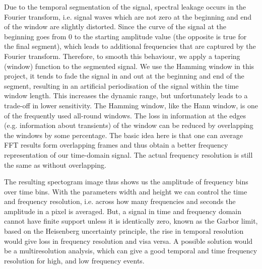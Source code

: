 
Due to the temporal segmentation of the signal, spectral leakage occurs in the Fourier transform, i.e. signal waves which are not zero at the beginning and end of the window are slightly distorted.
Since the curve of the signal at the beginning goes from 0 to the starting amplitude value (the opposite is true for the final segment), which leads to additional frequencies that are captured by the Fourier transform.
Therefore, to smooth this behaviour, we apply a tapering (window) function to the segmented signal. We use the Hamming window in this project, it tends to fade the signal in and out at the beginning and end of the segment, resulting in an artificial periodisation of the signal within the time window length. This increases the dynamic range, but unfortunately leads to a trade-off in lower sensitivity. The Hamming window, like the Hann window, is one of the frequently used all-round windows.
The loss in information at the edges (e.g. information about transients) of the window can be reduced by overlapping the windows by some percentage. The basic idea here is that one can average FFT results form overlapping frames and thus obtain a better frequency representation of our time-domain signal.
The actual frequency resolution is still the same as without overlapping.

The resulting spectogram image thus shows us the amplitude of frequency bins over time bins. With the parameters width and height we can control the time and frequency resolution, i.e. across how many frequencies and seconds the amplitude in a pixel is averaged.
But, a signal in time and frequency domain cannot have finite support unless it is identically zero, known as the Garbor limit, based on the Heisenberg uncertainty principle, the rise in temporal resolution would give loss in frequency resolution and visa versa.
A possible solution would be a multiresolution analysis, which can give a good temporal and time frequency resolution for high, and low frequency events.

